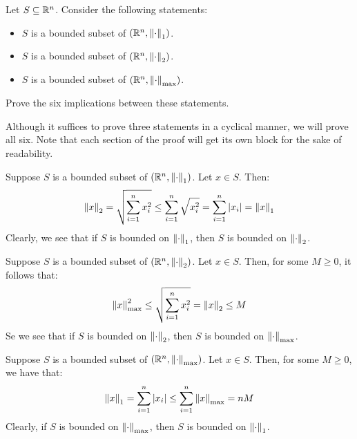 \newpage
\label{q5}
\begin{qu}[num=5]
    Let $ S \subseteq \mathbb{R}^{n} $. Consider the following statements:
    \begin{itemize}
        \item $ S $ is a bounded subset of $ (\mathbb{R}^{n}, \left\|\cdot\right\|_{1}) $.
        \item $ S $ is a bounded subset of $ (\mathbb{R}^{n}, \left\|\cdot\right\|_{2}) $.
        \item $ S $ is a bounded subset of $ (\mathbb{R}^{n},
            \left\|\cdot\right\|_{\textrm{max}}) $.
    \end{itemize}
    Prove the six implications between these statements.
\end{qu}
Although it suffices to prove three statements in a cyclical manner,
we will prove all six. Note that each section of the proof will get its own block
for the sake of readability.

\begin{soln}[title=1 implies 2]
    Suppose $ S $ is a bounded subset of $ (\mathbb{R}^{n}, \left\|\cdot\right\|_{1}) $.
    Let $ x \in S $. Then:
    \begin{equation*}
        \left\|x\right\|_{2} = \sqrt{\sum_{i=1}^{n} {x_{i}^{2}} } \leq \sum_{i=1}^{n}
        {\sqrt{x_{i}^{2}}} 
        = \sum_{i=1}^{n} {\abs{x_{i}}} = \left\|x\right\|_{1}
    \end{equation*}
    Clearly, we see that if $ S $ is bounded on $ \left\|\cdot\right\|_{1} $,
    then $ S $ is bounded on $ \left\|\cdot\right\|_{2} $.
\end{soln}

\begin{soln}[title=2 implies Max]
    Suppose $ S $ is a bounded subset of $ (\mathbb{R}^{n}, \left\|\cdot\right\|_{2}) $.
    Let $ x \in S $. Then, for some $ M \geq 0 $, it follows that:
    \begin{equation*}
        \left\|x\right\|_{\textrm{max}}^{2} \leq \sqrt{\sum_{i=1}^{n} {x_{i}^{2}} }
        = \left\|x\right\|_{2} \leq M
    \end{equation*}
    Se we see that if $ S $ is bounded on $ \left\|\cdot\right\|_{2} $, then
    $ S $ is bounded on $ \left\|\cdot\right\|_{\textrm{max}} $.
\end{soln}

\begin{soln}[title=Max implies 1]
    Suppose $ S $ is a bounded subset of $ (\mathbb{R}^{n}, \left\|\cdot\right\|
    _{\textrm{max}}) $.
    Let $ x \in S $. Then, for some $ M \geq 0 $, we have that:
    \begin{equation*}
        \left\|x\right\|_{1} = \sum_{i=1}^{n} {\abs{x_{i}}} \leq \sum_{i=1}^{n} {\left\|x\right\|
        _{\textrm{max}}} = nM
    \end{equation*}
    Clearly, if $ S $ is bounded on $ \left\|\cdot\right\|_{\textrm{max}} $,
    then $ S $ is bounded on $ \left\|\cdot\right\|_{1} $.
\end{soln}


